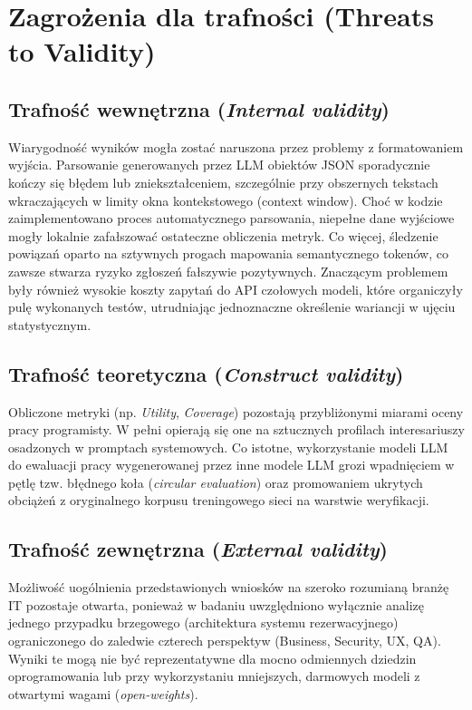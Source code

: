 \documentclass[conference]{IEEEtran}
\begin{document}
\section{Zagrożenia dla trafności (Threats to Validity)}

\subsection{Trafność wewnętrzna (\textit{Internal validity})}
Wiarygodność wyników mogła zostać naruszona przez problemy z formatowaniem wyjścia. Parsowanie generowanych przez LLM obiektów JSON sporadycznie kończy się błędem lub zniekształceniem, szczególnie przy obszernych tekstach wkraczających w limity okna kontekstowego (context window). Choć w kodzie zaimplementowano proces automatycznego parsowania, niepełne dane wyjściowe mogły lokalnie zafałszować ostateczne obliczenia metryk. Co więcej, śledzenie powiązań oparto na sztywnych progach mapowania semantycznego tokenów, co zawsze stwarza ryzyko zgłoszeń fałszywie pozytywnych. Znaczącym problemem były również wysokie koszty zapytań do API czołowych modeli, które organiczyły pulę wykonanych testów, utrudniając jednoznaczne określenie wariancji w ujęciu statystycznym.

\subsection{Trafność teoretyczna (\textit{Construct validity})}
Obliczone metryki (np. \textit{Utility}, \textit{Coverage}) pozostają przybliżonymi miarami oceny pracy programisty. W pełni opierają się one na sztucznych profilach interesariuszy osadzonych w promptach systemowych. Co istotne, wykorzystanie modeli LLM do ewaluacji pracy wygenerowanej przez inne modele LLM grozi wpadnięciem w pętlę tzw. błędnego koła (\textit{circular evaluation}) oraz promowaniem ukrytych obciążeń z oryginalnego korpusu treningowego sieci na warstwie weryfikacji.

\subsection{Trafność zewnętrzna (\textit{External validity})}
Możliwość uogólnienia przedstawionych wniosków na szeroko rozumianą branżę IT pozostaje otwarta, ponieważ w badaniu uwzględniono wyłącznie analizę jednego przypadku brzegowego (architektura systemu rezerwacyjnego) ograniczonego do zaledwie czterech perspektyw (Business, Security, UX, QA). Wyniki te mogą nie być reprezentatywne dla mocno odmiennych dziedzin oprogramowania lub przy wykorzystaniu mniejszych, darmowych modeli z otwartymi wagami (\textit{open-weights}).
\end{document}
